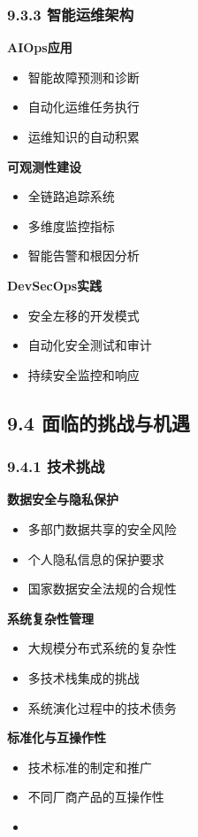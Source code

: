 \subsubsection{9.3.3 智能运维架构}\label{ux667aux80fdux8fd0ux7ef4ux67b6ux6784} \textbf{AIOps应用} \begin{itemize} \tightlist
\item 智能故障预测和诊断 \item 自动化运维任务执行 \item 运维知识的自动积累 \end{itemize} \textbf{可观测性建设} \begin{itemize} \tightlist \item 全链路追踪系统
\item 多维度监控指标 \item 智能告警和根因分析 \end{itemize} \textbf{DevSecOps实践} \begin{itemize} \tightlist \item 安全左移的开发模式 \item
自动化安全测试和审计 \item 持续安全监控和响应 \end{itemize} \subsection{9.4
面临的挑战与机遇}\label{ux9762ux4e34ux7684ux6311ux6218ux4e0eux673aux9047} \subsubsection{9.4.1
技术挑战}\label{ux6280ux672fux6311ux6218} \textbf{数据安全与隐私保护} \begin{itemize} \tightlist \item 多部门数据共享的安全风险 \item 个人隐私信息的保护要求
\item 国家数据安全法规的合规性 \end{itemize} \textbf{系统复杂性管理} \begin{itemize} \tightlist \item 大规模分布式系统的复杂性 \item 多技术栈集成的挑战 \item
系统演化过程中的技术债务 \end{itemize} \textbf{标准化与互操作性} \begin{itemize} \tightlist \item 技术标准的制定和推广 \item 不同厂商产品的互操作性 \item

\end{itemize}
